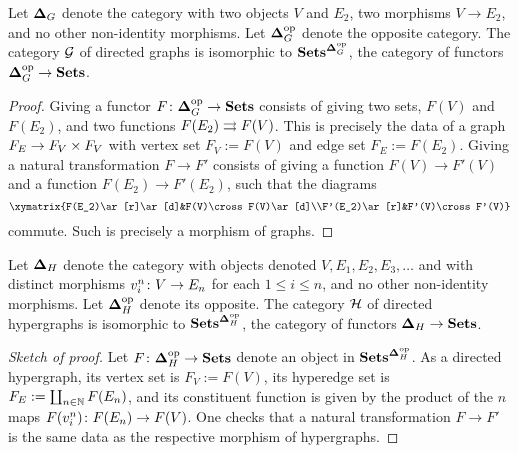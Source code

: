 \documentclass{amsart}
\def\bD{{\bf \Delta}}
\begin{document}
\begin{proposition}\label{prop:cat graph}

Let $\bD_G$ denote the category with two objects $V$ and $E_2$, two morphisms $V\to E_2$, and no other non-identity morphisms.  Let $\bD_G\op$ denote the opposite category.  The category $\mathcal{G}$ of directed graphs is isomorphic to $\Sets^{\bD_G\op}$, the category of functors $\bD_G\op\to\Sets$.

\end{proposition}

\begin{proof}

Giving a functor $F\taking\bD_G\op\to\Sets$ consists of giving two sets, $F(V)$ and $F(E_2)$, and two functions $F(E_2)\rightrightarrows F(V)$.  This is precisely the data of a graph $F_E\rightarrow F_V\times F_V$ with vertex set $F_V:=F(V)$ and edge set $F_E:=F(E_2)$.  Giving a natural transformation $F\to F'$ consists of giving a function $F(V)\to F'(V)$ and a function $F(E_2)\to F'(E_2)$, such that the diagrams $$\xymatrix{F(E_2)\ar[r]\ar[d]&F(V)\cross F(V)\ar[d]\\F'(E_2)\ar[r]&F'(V)\cross F'(V)}$$ commute.  Such is precisely a morphism of graphs.

\end{proof}

\begin{proposition}\label{prop:cat hyper}

Let $\bD_H$ denote the category with objects denoted $V, E_1,E_2,E_3,\ldots$ and with distinct morphisms $v_i^n\colon V\rightarrow E_n$ for each $1\leq i\leq n$, and no other non-identity morphisms.  Let $\bD_H\op$ denote its opposite.   The category $\mathcal{H}$ of directed hypergraphs is isomorphic to $\Sets^{\bD_H\op}$, the category of functors $\bD_H\to\Sets$.  

\end{proposition}

\begin{proof}[Sketch of proof]

Let $F\taking\bD_H\op\to\Sets$ denote an object in $\Sets^{\bD_H\op}$.  As a directed hypergraph, its vertex set is $F_V:=F(V)$, its hyperedge set is $F_E:=\coprod_{n\in{\mathbb N}}F(E_n)$, and its constituent function is given by the product of the $n$ maps $F(v^n_i)\colon F(E_n)\rightarrow F(V)$.  One checks that a natural transformation $F\to F'$ is the same data as the respective morphism of hypergraphs.

\end{proof}
\end{document}
